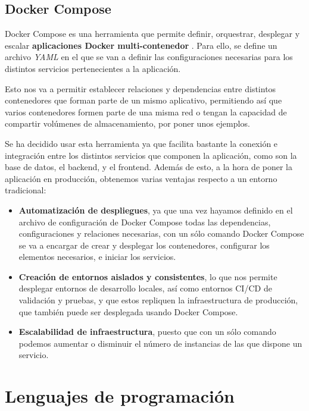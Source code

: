 \subsection{Docker Compose}

Docker Compose es una herramienta que permite definir, orquestrar, desplegar y escalar \textbf{aplicaciones Docker multi-contenedor} \cite{docker-compose:overview}. Para ello, se define un archivo \textit{YAML} en el que se van a definir las  configuraciones necesarias para los distintos servicios pertenecientes a la aplicación. 

Esto nos va a permitir establecer relaciones y dependencias entre distintos contenedores que forman parte de un mismo aplicativo, permitiendo así que varios contenedores formen parte de una misma red o tengan la capacidad de compartir volúmenes de almacenamiento, por poner unos ejemplos.

Se ha decidido usar esta herramienta ya que facilita bastante la conexión e integración entre los distintos servicios que componen la aplicación, como son la base de datos, el backend, y el frontend. Además de esto, a la hora de poner la aplicación en producción, obtenemos varias ventajas respecto a un entorno tradicional:

\begin{itemize}

\item \textbf{Automatización de despliegues}, ya que una vez hayamos definido en el archivo de configuración de Docker Compose todas las dependencias, configuraciones y relaciones necesarias, con un sólo comando Docker Compose se va a encargar de crear y desplegar los contenedores, configurar los elementos necesarios, e iniciar los servicios.
\item \textbf{Creación de entornos aislados y consistentes}, lo que nos permite desplegar entornos de desarrollo locales, así como entornos CI/CD de validación y pruebas, y que estos repliquen la infraestructura de producción, que también puede ser desplegada usando Docker Compose.
\item \textbf{Escalabilidad de infraestructura}, puesto que con un sólo comando podemos aumentar o disminuir el número de instancias de las que dispone un servicio.	
\end{itemize}


\section{Lenguajes de programación}

